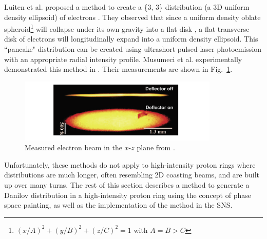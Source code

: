 Luiten et al. proposed a method to create a \{3, 3\} distribution (a 3D uniform density ellipsoid) of electrons \cite{Luiten2004}. They observed that since a uniform density oblate spheroid\footnote{$(x/A)^2 + (y/B)^2 + (z/C)^2 = 1$ with $A = B > C$} will collapse under its own gravity into a flat disk \cite{Lin1965}, a flat transverse disk of electrons will longitudinally expand into a uniform density ellipsoid. This ``pancake" distribution can be created using ultrashort pulsed-laser photoemission with an appropriate radial intensity profile. Musumeci et al. experimentally demonstrated this method in \cite{Musumeci2008}. Their measurements are shown in Fig.~\ref{fig:Musumeci}.
%
\begin{figure}[!p]
    \centering
    \includegraphics[width=0.85\textwidth]{Images/chapter1/Musumeci_fig2.png}
    \caption{Measured electron beam in the $x$-$z$ plane from \cite{Musumeci2008}.}
    \label{fig:Musumeci}
\end{figure}
%

Unfortunately, these methods do not apply to high-intensity proton rings where distributions are much longer, often resembling 2D coasting beams, and are built up over many turns. The rest of this section describes a method to generate a Danilov distribution in a high-intensity proton ring using the concept of phase space painting, as well as the implementation of the method in the SNS.


